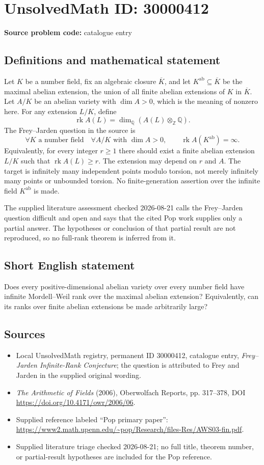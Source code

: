 \documentclass[11pt]{article}
\newcommand{\Z}{\mathbb{Z}}
\newcommand{\Q}{\mathbb{Q}}
\begin{document}
\section*{UnsolvedMath ID: 30000412}
\textbf{Source problem code:} catalogue entry
\subsection{Definitions and mathematical statement}
Let \(K\) be a number field, fix an algebraic closure \(\overline K\), and let \(K^{\mathrm{ab}}\subseteq\overline K\) be the maximal abelian extension, the union of all finite abelian extensions of \(K\) in \(\overline K\). Let \(A/K\) be an abelian variety with \(\dim A>0\), which is the meaning of nonzero here. For any extension \(L/K\), define
\[
\operatorname{rk}A(L)=\dim_{\Q}(A(L)\otimes_{\Z}\Q).
\]
The Frey--Jarden question in the source is
\[
\forall K\text{ a number field}\quad\forall A/K\text{ with }\dim A>0,
\qquad\operatorname{rk}A(K^{\mathrm{ab}})=\infty.
\]
Equivalently, for every integer \(r\geq1\) there should exist a finite abelian extension \(L/K\) such that \(\operatorname{rk}A(L)\geq r\). The extension may depend on \(r\) and \(A\). The target is infinitely many independent points modulo torsion, not merely infinitely many points or unbounded torsion. No finite-generation assertion over the infinite field \(K^{\mathrm{ab}}\) is made.

The supplied literature assessment checked 2026-08-21 calls the Frey--Jarden question difficult and open and says that the cited Pop work supplies only a partial answer. The hypotheses or conclusion of that partial result are not reproduced, so no full-rank theorem is inferred from it.
\subsection{Short English statement}
Does every positive-dimensional abelian variety over every number field have infinite Mordell--Weil rank over the maximal abelian extension? Equivalently, can its ranks over finite abelian extensions be made arbitrarily large?
\subsection{Sources}
\begin{itemize}
\item Local UnsolvedMath registry, permanent ID 30000412, catalogue entry, \emph{Frey--Jarden Infinite-Rank Conjecture}; the question is attributed to Frey and Jarden in the supplied original wording.
\item \emph{The Arithmetic of Fields} (2006), Oberwolfach Reports, pp. 317--378, DOI \url{https://doi.org/10.4171/owr/2006/06}.
\item Supplied reference labeled ``Pop primary paper'': \url{https://www2.math.upenn.edu/~pop/Research/files-Res/AWS03-fin.pdf}.
\item Supplied literature triage checked 2026-08-21; no full title, theorem number, or partial-result hypotheses are included for the Pop reference.
\end{itemize}
\end{document}

